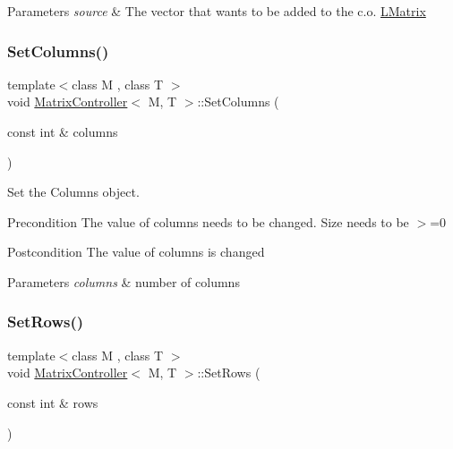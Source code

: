 \begin{DoxyParams}{Parameters}
{\em source} & The vector that wants to be added to the c.\+o. \mbox{\hyperlink{class_l_matrix}{L\+Matrix}} \\
\hline
\end{DoxyParams}
\mbox{\label{class_matrix_controller_a6e68e5f2260f1d80afc5891c60301927}} 
\subsubsection{\texorpdfstring{SetColumns()}{SetColumns()}}
{\footnotesize\ttfamily template$<$class M , class T $>$ \\
void \mbox{\hyperlink{class_matrix_controller}{Matrix\+Controller}}$<$ M, T $>$\+::Set\+Columns (\begin{DoxyParamCaption}\item[{const int \&}]{columns }\end{DoxyParamCaption})}



Set the Columns object. 

\begin{DoxyPrecond}{Precondition}
The value of columns needs to be changed. Size needs to be $>$=0 
\end{DoxyPrecond}
\begin{DoxyPostcond}{Postcondition}
The value of columns is changed
\end{DoxyPostcond}

\begin{DoxyParams}{Parameters}
{\em columns} & number of columns \\
\hline
\end{DoxyParams}
\mbox{\label{class_matrix_controller_ad659b02670dce5a4d1e6a1b73ca63513}} 
\subsubsection{\texorpdfstring{SetRows()}{SetRows()}}
{\footnotesize\ttfamily template$<$class M , class T $>$ \\
void \mbox{\hyperlink{class_matrix_controller}{Matrix\+Controller}}$<$ M, T $>$\+::Set\+Rows (\begin{DoxyParamCaption}\item[{const int \&}]{rows }\end{DoxyParamCaption})}



